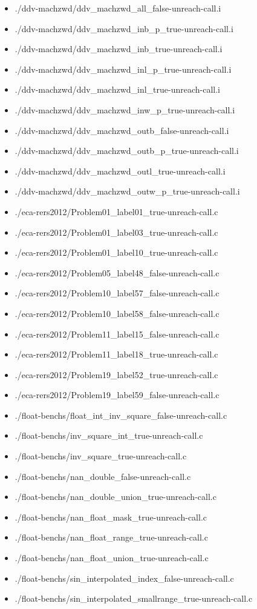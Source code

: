 \documentclass[envcountsame]{llncs}
\begin{document}
\begin{itemize}
\item ./ddv-machzwd/ddv\_machzwd\_all\_false-unreach-call.i
\item ./ddv-machzwd/ddv\_machzwd\_inb\_p\_true-unreach-call.i
\item ./ddv-machzwd/ddv\_machzwd\_inb\_true-unreach-call.i
\item ./ddv-machzwd/ddv\_machzwd\_inl\_p\_true-unreach-call.i
\item ./ddv-machzwd/ddv\_machzwd\_inl\_true-unreach-call.i
\item ./ddv-machzwd/ddv\_machzwd\_inw\_p\_true-unreach-call.i
\item ./ddv-machzwd/ddv\_machzwd\_outb\_false-unreach-call.i
\item ./ddv-machzwd/ddv\_machzwd\_outb\_p\_true-unreach-call.i
\item ./ddv-machzwd/ddv\_machzwd\_outl\_true-unreach-call.i
\item ./ddv-machzwd/ddv\_machzwd\_outw\_p\_true-unreach-call.i


\item ./eca-rers2012/Problem01\_label01\_true-unreach-call.c
\item ./eca-rers2012/Problem01\_label03\_true-unreach-call.c
\item ./eca-rers2012/Problem01\_label10\_true-unreach-call.c
\item ./eca-rers2012/Problem05\_label48\_false-unreach-call.c
\item ./eca-rers2012/Problem10\_label57\_false-unreach-call.c
\item ./eca-rers2012/Problem10\_label58\_false-unreach-call.c
\item ./eca-rers2012/Problem11\_label15\_false-unreach-call.c
\item ./eca-rers2012/Problem11\_label18\_true-unreach-call.c
\item ./eca-rers2012/Problem19\_label52\_true-unreach-call.c
\item ./eca-rers2012/Problem19\_label59\_false-unreach-call.c


\item ./float-benchs/float\_int\_inv\_square\_false-unreach-call.c
\item ./float-benchs/inv\_square\_int\_true-unreach-call.c
\item ./float-benchs/inv\_square\_true-unreach-call.c
\item ./float-benchs/nan\_double\_false-unreach-call.c
\item ./float-benchs/nan\_double\_union\_true-unreach-call.c
\item ./float-benchs/nan\_float\_mask\_true-unreach-call.c
\item ./float-benchs/nan\_float\_range\_true-unreach-call.c
\item ./float-benchs/nan\_float\_union\_true-unreach-call.c
\item ./float-benchs/sin\_interpolated\_index\_false-unreach-call.c
\item ./float-benchs/sin\_interpolated\_smallrange\_true-unreach-call.c



\end{itemize}
\end{document}
